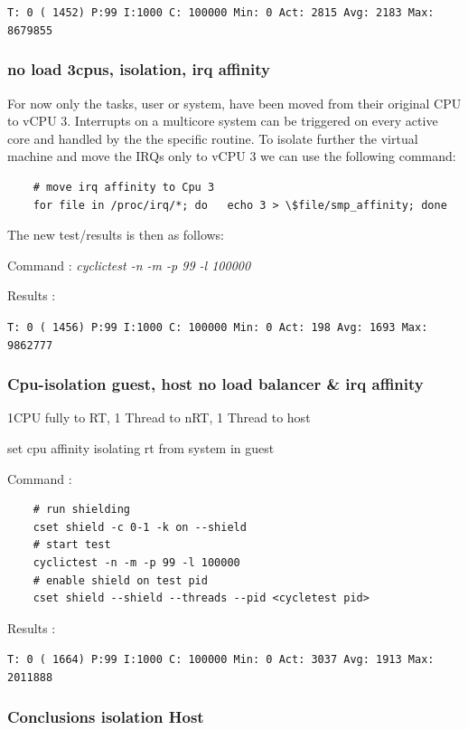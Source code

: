 \documentclass[]{scrartcl}
\begin{document}
\noindent  \texttt{T: 0 ( 1452) P:99 I:1000 C: 100000 Min:      0 Act: 2815 Avg: 2183 Max:  8679855}

\subsubsection{no load 3cpus, isolation, irq affinity}

For now only the tasks, user or system, have been moved from their original CPU to vCPU 3. Interrupts on a multicore system can be triggered on every active core and handled by the the specific routine. To isolate further the virtual machine and move the IRQs only to vCPU 3 we can use the following command: 

\begin{verbatim}
	# move irq affinity to Cpu 3
	for file in /proc/irq/*; do   echo 3 > \$file/smp_affinity; done
\end{verbatim}

The new test/results is then as follows:

\noindent Command : \textit{cyclictest -n -m -p 99 -l 100000}

\noindent Results :

\noindent \texttt{T: 0 ( 1456) P:99 I:1000 C: 100000 Min:      0 Act:  198 Avg: 1693 Max:  9862777}

\subsubsection{Cpu-isolation guest, host no load balancer \& irq affinity }

1CPU fully to RT, 1 Thread to nRT, 1 Thread to host

set cpu affinity isolating rt from system in guest
\bigskip

\noindent Command : 

\begin{verbatim}
	# run shielding
	cset shield -c 0-1 -k on --shield
	# start test
	cyclictest -n -m -p 99 -l 100000
	# enable shield on test pid
	cset shield --shield --threads --pid <cycletest pid>
\end{verbatim}

\noindent Results :

\noindent \texttt{T: 0 ( 1664) P:99 I:1000 C: 100000 Min:      0 Act: 3037 Avg: 1913 Max:  2011888}

\subsubsection{Conclusions isolation Host}
\end{document}
